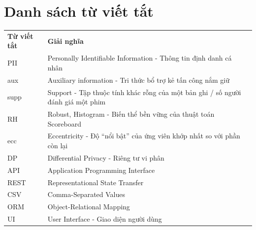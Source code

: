 \clearpage
{}
{}
\chapter*{Danh sách từ viết tắt}

\renewcommand{\arraystretch}{1.3}
\noindent
\begin{tabularx}{\linewidth}{p{2.8cm} X}
\textbf{Từ viết tắt} & \textbf{Giải nghĩa} \\[2pt]
PII & Personally Identifiable Information - Thông tin định danh cá nhân \\
aux & Auxiliary information - Tri thức bổ trợ kẻ tấn công nắm giữ \\
supp & Support - Tập thuộc tính khác rỗng của một bản ghi / số người đánh giá một phim \\
RH & Robust, Histogram - Biến thể bền vững của thuật toán Scoreboard \\
ecc & Eccentricity - Độ ``nổi bật'' của ứng viên khớp nhất so với phần còn lại \\
DP & Differential Privacy - Riêng tư vi phân \\
API & Application Programming Interface \\
REST & Representational State Transfer \\
CSV & Comma-Separated Values \\
ORM & Object-Relational Mapping \\
UI & User Interface - Giao diện người dùng \\
\end{tabularx}
